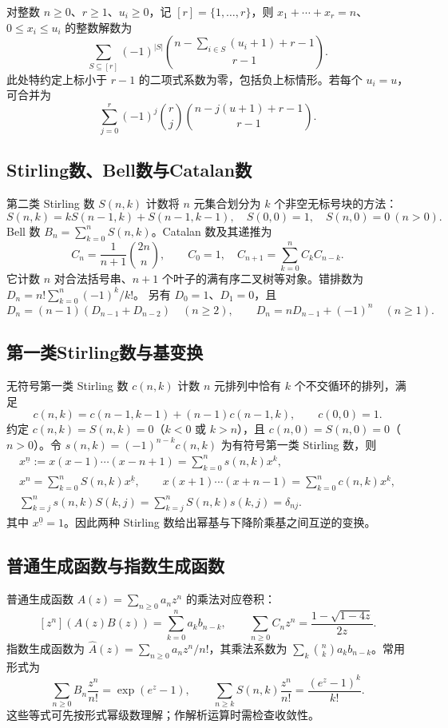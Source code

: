 \documentclass[../main.tex]{subfiles}
\begin{document}
对整数 $n\ge0$、$r\ge1$、$u_i\ge0$，记 $[r]=\{1,\ldots,r\}$，则 $x_1+\cdots+x_r=n$、$0\le x_i\le u_i$ 的整数解数为
\[
\sum_{S\subseteq[r]}(-1)^{|S|}
\binom{n-\sum_{i\in S}(u_i+1)+r-1}{r-1}.
\]
此处特约定上标小于 $r-1$ 的二项式系数为零，包括负上标情形。若每个 $u_i=u$，可合并为
\[
\sum_{j=0}^r(-1)^j\binom rj\binom{n-j(u+1)+r-1}{r-1}.
\]
\subsection{Stirling数、Bell数与Catalan数}
第二类 Stirling 数 $S(n,k)$ 计数将 $n$ 元集合划分为 $k$ 个非空无标号块的方法：
\[
S(n,k)=kS(n-1,k)+S(n-1,k-1),\quad
S(0,0)=1,\quad S(n,0)=0\ (n>0).
\]
Bell 数 $B_n=\sum_{k=0}^nS(n,k)$。Catalan 数及其递推为
\[
C_n=\frac1{n+1}\binom{2n}{n},\qquad
C_0=1,\quad C_{n+1}=\sum_{k=0}^nC_kC_{n-k}.
\]
它计数 $n$ 对合法括号串、$n+1$ 个叶子的满有序二叉树等对象。错排数为 $D_n=n!\sum_{k=0}^n(-1)^k/k!$。
另有 $D_0=1$、$D_1=0$，且
\[
D_n=(n-1)(D_{n-1}+D_{n-2})\quad(n\ge2),\qquad
D_n=nD_{n-1}+(-1)^n\quad(n\ge1).
\]
\subsection{第一类Stirling数与基变换}
无符号第一类 Stirling 数 $c(n,k)$ 计数 $n$ 元排列中恰有 $k$ 个不交循环的排列，满足
\[
c(n,k)=c(n-1,k-1)+(n-1)c(n-1,k),\qquad c(0,0)=1.
\]
约定 $c(n,k)=S(n,k)=0$（$k<0$ 或 $k>n$），且 $c(n,0)=S(n,0)=0$（$n>0$）。令 $s(n,k)=(-1)^{n-k}c(n,k)$ 为有符号第一类 Stirling 数，则
\begin{gather*}
x^{\underline n}:=x(x-1)\cdots(x-n+1)=\sum_{k=0}^n s(n,k)x^k,\\
x^n=\sum_{k=0}^nS(n,k)x^{\underline k},\qquad
x(x+1)\cdots(x+n-1)=\sum_{k=0}^n c(n,k)x^k,\\
\sum_{k=j}^n s(n,k)S(k,j)=\sum_{k=j}^n S(n,k)s(k,j)=\delta_{nj}.
\end{gather*}
其中 $x^{\underline0}=1$。因此两种 Stirling 数给出幂基与下降阶乘基之间互逆的变换。
\subsection{普通生成函数与指数生成函数}
普通生成函数 $A(z)=\sum_{n\ge0}a_nz^n$ 的乘法对应卷积：
\[
[z^n](A(z)B(z))=\sum_{k=0}^na_kb_{n-k},\qquad
\sum_{n\ge0}C_nz^n=\frac{1-\sqrt{1-4z}}{2z}.
\]
指数生成函数为 $\widehat A(z)=\sum_{n\ge0}a_nz^n/n!$，其乘法系数为 $\sum_k\binom nka_kb_{n-k}$。常用形式为
\[
\sum_{n\ge0}B_n\frac{z^n}{n!}=\exp(e^z-1),\qquad
\sum_{n\ge k}S(n,k)\frac{z^n}{n!}=\frac{(e^z-1)^k}{k!}.
\]
这些等式可先按形式幂级数理解；作解析运算时需检查收敛性。
\end{document}
